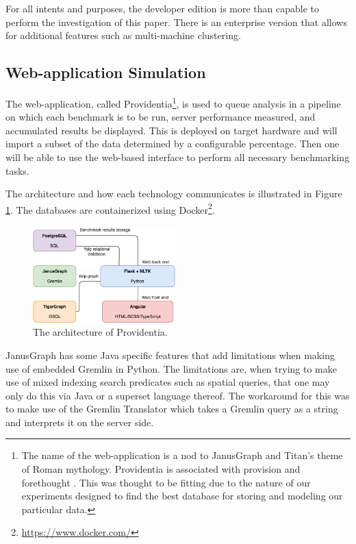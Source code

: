 For all intents and purposes, the developer edition is more than capable to perform the investigation of this paper. There is an enterprise version that allows for additional features such as multi-machine clustering.

\subsection{Web-application Simulation}
The web-application, called Providentia\footnote{The name of the web-application is a nod to JanusGraph and Titan's theme of Roman mythology. Providentia is associated with provision and forethought \cite{providentia-meaning}. This was thought to be fitting due to the nature of our experiments designed to find the best database for storing and modeling our particular data.}, is used to queue analysis in a pipeline on which each benchmark is to be run, server performance measured, and accumulated results be displayed. This is deployed on target hardware and will import a subset of the data determined by a configurable percentage. Then one will be able to use the web-based interface to perform all necessary benchmarking tasks.

The architecture and how each technology communicates is illustrated in Figure \ref{fig:providentia-architecture}. The databases are containerized using Docker\footnote{\url{https://www.docker.com/}}.

\begin{figure}[h]
    \centering
    \includegraphics[width=0.49\textwidth]{img/providentia-architecture.pdf}
    \caption{The architecture of Providentia.}
    \label{fig:providentia-architecture}
\end{figure}

JanusGraph has some Java specific features that add limitations when making use of embedded Gremlin in Python. The limitations are, when trying to make use of mixed indexing search predicates such as spatial queries, that one may only do this via Java or a superset language thereof. The workaround for this was to make use of the Gremlin Translator which takes a Gremlin query as a string and interprets it on the server side.

